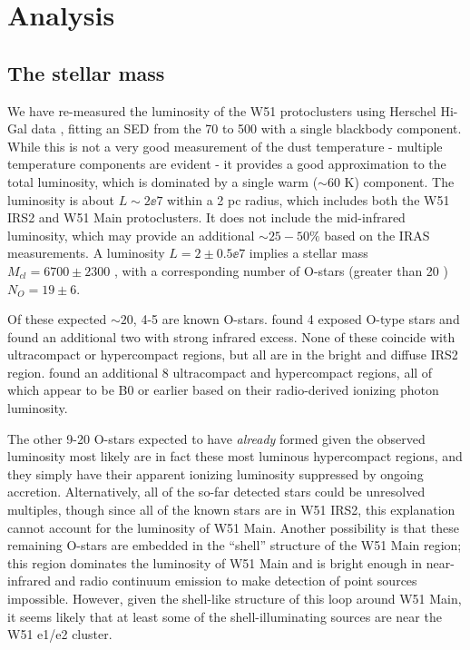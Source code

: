 \section{Analysis}
\subsection{The stellar mass}

We have re-measured the luminosity of the W51 protoclusters using Herschel
Hi-Gal data \citep{Molinari2010a,Traficante2011a}, fitting an SED from the 70
to 500 \um with a single blackbody component.  While this is not a very good
measurement of the dust temperature - multiple temperature components are
evident \citep{Sievers1991a} - it provides a good approximation to the total
luminosity, which is dominated by a single warm ($\sim60$ K) component.  The
luminosity is about $L\sim2\ee{7}$ \lsun within a 2 pc radius, which includes
both the W51 IRS2 and W51 Main protoclusters.  It does not include the
mid-infrared luminosity, which may provide an additional $\sim25-50\%$ based on
the IRAS measurements. A luminosity $L=2\pm0.5\ee{7}$ \lsun implies a stellar
mass $M_{cl} = 6700 \pm 2300$ \msun, with a corresponding number of O-stars
(greater than 20 \msun) $N_O = 19 \pm 6$.

Of these expected $\sim20$, 4-5 are known O-stars.  \citet{Figueredo2008a} found
4 exposed O-type stars and \citet{Barbosa2008a} found an additional two with
strong infrared excess.  None of these coincide with ultracompact or
hypercompact \hii regions, but all are in the bright and diffuse IRS2 region.
\citet{Mehringer1994a} found an additional 8 ultracompact and hypercompact \hii
regions, all of which appear to be B0 or earlier based on their radio-derived
ionizing photon luminosity.

The other 9-20 O-stars expected to have \emph{already} formed given the observed
luminosity most likely are in fact these most luminous hypercompact \hii regions,
and they simply have their apparent ionizing luminosity suppressed by ongoing
accretion.  Alternatively, all of the so-far detected stars could be unresolved
multiples, though since all of the known stars are in W51 IRS2, this
explanation cannot account for the luminosity of W51 Main.  Another possibility
is that these remaining O-stars are embedded in the ``shell'' structure of the
W51 Main region; this region dominates the luminosity of W51 Main and is bright
enough in near-infrared and radio continuum emission to make detection of point
sources impossible.  However, given the shell-like structure of this loop around
W51 Main, it seems likely that at least some of the shell-illuminating sources
are near the W51 e1/e2 cluster.

